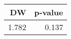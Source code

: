 \begin{table}[ht]
\centering
\begin{tabular}{rr}
  \toprule
DW & p-value \\ 
  \midrule
1.782 & 0.137 \\ 
   \bottomrule
\end{tabular}
\end{table}
